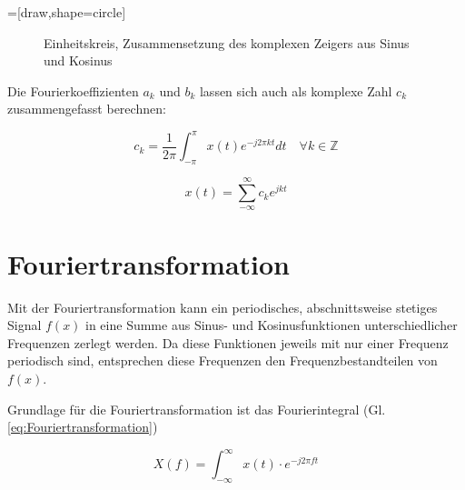 =[draw,shape=circle]
\begin{figure}[ht]
\centering
{}
\caption{Einheitskreis, Zusammensetzung des komplexen Zeigers aus Sinus und Kosinus}
\label{pic:Einheitskreis}
\end{figure}


Die Fourierkoeffizienten $a_k$ und $b_k$ lassen sich auch als komplexe Zahl $c_k$ zusammengefasst berechnen:

\begin{equation}
 c_k = \frac{1}{2\pi} \int_{-\pi}^{\pi} x(t) e^{-j2\pi kt} dt \quad \forall k \in \mathbb{Z}
\end{equation}



\begin{equation}
 x(t) = \sum_{-\infty}^{\infty} c_k e^{jkt}
\end{equation}


\section{Fouriertransformation}
Mit der Fouriertransformation kann ein periodisches, abschnittsweise stetiges Signal $f(x)$ in eine Summe aus Sinus- und
Kosinusfunktionen unterschiedlicher Frequenzen zerlegt werden. Da diese Funktionen jeweils mit nur einer Frequenz periodisch sind, entsprechen diese
Frequenzen den Frequenzbestandteilen von $f(x)$. 

Grundlage für die Fouriertransformation ist das Fourierintegral (Gl. \ref{eq:Fouriertransformation})

\begin{equation}\label{eq:Fouriertransformation}
 X(f) = \int^{\infty}_{-\infty} x(t) \cdot e^{-j 2 \pi f t}
\end{equation}

